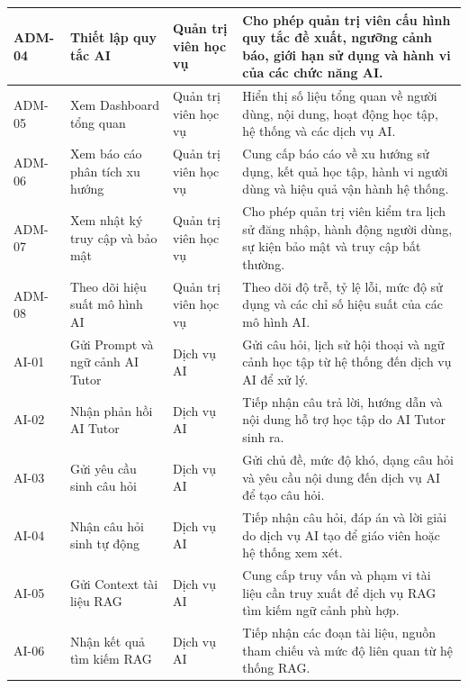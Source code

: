 \begin{longtable}{|p{}|p{}|p{}|p{}|}
ADM-04 &
Thiết lập quy tắc AI &
Quản trị viên học vụ &
Cho phép quản trị viên cấu hình quy tắc đề xuất, ngưỡng cảnh báo, giới hạn sử dụng và hành vi của các chức năng AI. \\
\hline

ADM-05 &
Xem Dashboard tổng quan &
Quản trị viên học vụ &
Hiển thị số liệu tổng quan về người dùng, nội dung, hoạt động học tập, hệ thống và các dịch vụ AI. \\
\hline

ADM-06 &
Xem báo cáo phân tích xu hướng &
Quản trị viên học vụ &
Cung cấp báo cáo về xu hướng sử dụng, kết quả học tập, hành vi người dùng và hiệu quả vận hành hệ thống. \\
\hline

ADM-07 &
Xem nhật ký truy cập và bảo mật &
Quản trị viên học vụ &
Cho phép quản trị viên kiểm tra lịch sử đăng nhập, hành động người dùng, sự kiện bảo mật và truy cập bất thường. \\
\hline

ADM-08 &
Theo dõi hiệu suất mô hình AI &
Quản trị viên học vụ &
Theo dõi độ trễ, tỷ lệ lỗi, mức độ sử dụng và các chỉ số hiệu suất của các mô hình AI. \\
\hline

AI-01 &
Gửi Prompt và ngữ cảnh AI Tutor &
Dịch vụ AI &
Gửi câu hỏi, lịch sử hội thoại và ngữ cảnh học tập từ hệ thống đến dịch vụ AI để xử lý. \\
\hline

AI-02 &
Nhận phản hồi AI Tutor &
Dịch vụ AI &
Tiếp nhận câu trả lời, hướng dẫn và nội dung hỗ trợ học tập do AI Tutor sinh ra. \\
\hline

AI-03 &
Gửi yêu cầu sinh câu hỏi &
Dịch vụ AI &
Gửi chủ đề, mức độ khó, dạng câu hỏi và yêu cầu nội dung đến dịch vụ AI để tạo câu hỏi. \\
\hline

AI-04 &
Nhận câu hỏi sinh tự động &
Dịch vụ AI &
Tiếp nhận câu hỏi, đáp án và lời giải do dịch vụ AI tạo để giáo viên hoặc hệ thống xem xét. \\
\hline

AI-05 &
Gửi Context tài liệu RAG &
Dịch vụ AI &
Cung cấp truy vấn và phạm vi tài liệu cần truy xuất để dịch vụ RAG tìm kiếm ngữ cảnh phù hợp. \\
\hline

AI-06 &
Nhận kết quả tìm kiếm RAG &
Dịch vụ AI &
Tiếp nhận các đoạn tài liệu, nguồn tham chiếu và mức độ liên quan từ hệ thống RAG. \\
\hline


\end{longtable}
